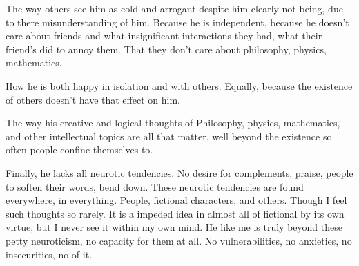 \par The way others see him as cold and arrogant despite him clearly not being, due to there misunderstanding of him. Because he is independent, because he doesn't care about friends and what insignificant interactions they had, what their friend's did to annoy them. That they don't care about philosophy, physics, mathematics. 
\par How he is both happy in isolation and with others. Equally, because the existence of others doesn't have that effect on him.
\par The way his creative and logical thoughts of Philosophy, physics, mathematics, and other intellectual topics are all that matter, well beyond the existence so often people confine themselves to.
\par Finally, he lacks all neurotic tendencies. No desire for complements, praise, people to soften their words, bend down. These neurotic tendencies are found everywhere, in everything. People, fictional characters, and others. Though I feel such thoughts so rarely. It is a impeded idea in almost all of fictional by its own virtue, but I never see it within my own mind. He like me is truly beyond these petty neuroticism, no capacity for them at all. No vulnerabilities, no anxieties, no insecurities, no of it.
